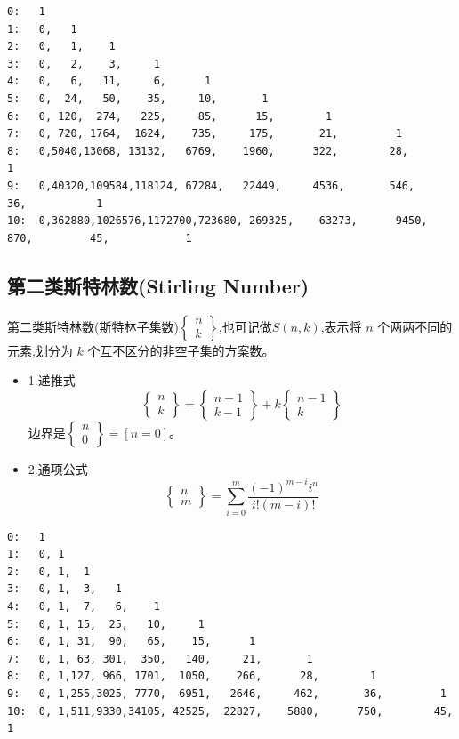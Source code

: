 \begin{lstlisting}[caption={}]
0:   1
1:   0,   1
2:   0,   1,    1
3:   0,   2,    3,     1
4:   0,   6,   11,     6,      1
5:   0,  24,   50,    35,     10,       1
6:   0, 120,  274,   225,     85,      15,        1
7:   0, 720, 1764,  1624,    735,     175,       21,         1
8:   0,5040,13068, 13132,   6769,    1960,      322,        28,          1
9:   0,40320,109584,118124, 67284,   22449,     4536,       546,        36,           1
10:  0,362880,1026576,1172700,723680, 269325,    63273,      9450,       870,         45,            1
\end{lstlisting}


\subsection{第二类斯特林数(Stirling Number)}
第二类斯特林数(斯特林子集数)$\begin{Bmatrix}n\\ k\end{Bmatrix}$,也可记做$ S(n,k)$,表示将 $n$ 个两两不同的元素,划分为 $k$ 个互不区分的非空子集的方案数。

\begin{itemize}
    \item 1.递推式
		$$\begin{Bmatrix}n\\ k\end{Bmatrix}=\begin{Bmatrix}n-1\\ k-1\end{Bmatrix}+k\begin{Bmatrix}n-1\\ k\end{Bmatrix}$$
		边界是$\begin{Bmatrix}n\\ 0\end{Bmatrix}=[n=0]$。
	\item 2.通项公式
		$$\begin{Bmatrix}n\\m\end{Bmatrix}=\sum\limits_{i=0}^m\dfrac{(-1)^{m-i}i^n}{i!(m-i)!}$$
\end{itemize}
\begin{lstlisting}[caption={}]
0:   1
1:   0, 1
2:   0, 1,  1
3:   0, 1,  3,   1
4:   0, 1,  7,   6,    1
5:   0, 1, 15,  25,   10,     1
6:   0, 1, 31,  90,   65,    15,      1
7:   0, 1, 63, 301,  350,   140,     21,       1
8:   0, 1,127, 966, 1701,  1050,    266,      28,        1
9:   0, 1,255,3025, 7770,  6951,   2646,     462,       36,         1
10:  0, 1,511,9330,34105, 42525,  22827,    5880,      750,        45,          1
\end{lstlisting}

